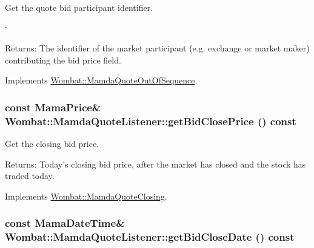 Get the quote bid participant identifier. 

`

\begin{Desc}
\item[Returns:]The identifier of the market participant (e.g. exchange or market maker) contributing the bid price field. \end{Desc}


Implements \hyperlink{classWombat_1_1MamdaQuoteOutOfSequence_b48217f292612f65d8a0ab93954a223c}{Wombat::Mamda\-Quote\-Out\-Of\-Sequence}.\hypertarget{classWombat_1_1MamdaQuoteListener_0c5bde1b3a4bfafdaef20c99c0c63c07}{
\subsubsection[getBidClosePrice]{\setlength{\rightskip}{0pt plus 5cm}const Mama\-Price\& Wombat::Mamda\-Quote\-Listener::get\-Bid\-Close\-Price () const}}
\label{classWombat_1_1MamdaQuoteListener_0c5bde1b3a4bfafdaef20c99c0c63c07}


Get the closing bid price. 

\begin{Desc}
\item[Returns:]Today's closing bid price, after the market has closed and the stock has traded today. \end{Desc}


Implements \hyperlink{classWombat_1_1MamdaQuoteClosing_49a102e8abafb806713366521b9adeea}{Wombat::Mamda\-Quote\-Closing}.\hypertarget{classWombat_1_1MamdaQuoteListener_8b67bfdd143925309c46e4bb86a5a53f}{
\subsubsection[getBidCloseDate]{\setlength{\rightskip}{0pt plus 5cm}const Mama\-Date\-Time\& Wombat::Mamda\-Quote\-Listener::get\-Bid\-Close\-Date () const}}
\label{classWombat_1_1MamdaQuoteListener_8b67bfdd143925309c46e4bb86a5a53f}


